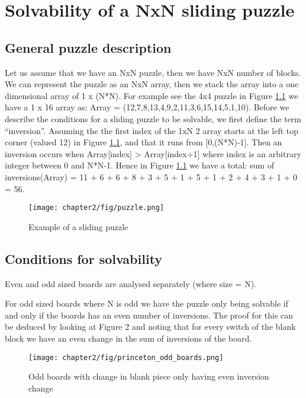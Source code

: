 \graphicspath{{chapter2/fig}}
\chapter{Solvability of a NxN sliding puzzle}
\label{chap:Solvability of a NxN sliding puzzle}
\section{General puzzle description}
Let us assume that we have an NxN puzzle, then we have NxN number of blocks. We can represent the puzzle as an NxN array, then we stack the array into a one dimensional array of 1 x (N*N). For example see the 4x4 puzzle in Figure \ref{fig:sliding_puzzle} we have a 1 x 16 array as: 
Array = (12,7,8,13,4,9,2,11,3,6,15,14,5,1,10).
Before we describe the conditions for a sliding puzzle to be solvable, we first define the term “inversion”. Assuming the the first index of the 1xN 2 array starts at the left top corner (valued 12) in
Figure \ref{fig:sliding_puzzle}, and that it runs from [0,(N*N)-1]. Then an inversion occurs when Array[index] >
Array[index+1] where index is an arbitrary integer between 0 and N*N-1. Hence in Figure \ref{fig:sliding_puzzle} we have a
total: sum of inversions(Array) = 11 + 6 + 6 + 8 + 3 + 5 + 1 + 5 + 1 + 2 + 4 + 3 + 1 + 0 = 56.

\begin{figure}[!htb]
	\centering
	\texttt{[image: chapter2/fig/puzzle.png]}
	\caption{Example of a sliding puzzle}
	\label{fig:sliding_puzzle}
\end{figure}

\section{Conditions for solvability}
Even and odd sized boards are analysed separately (where size = N).

For odd sized boards where N is odd we have the puzzle only being solvable if and only if the boards
has an even number of inversions. The proof for this can be deduced by looking at Figure 2 and noting that for every switch of the blank block we have an even change in the sum of inversions of the board. \cite{princeton_8puzzle_assignment}

\begin{figure}[!htb]
	\centering
	\texttt{[image: chapter2/fig/princeton\_odd\_boards.png]}
	\caption{Odd boards with change in blank piece only having even inversion change \cite{princeton_8puzzle_assignment}}
	\label{fig:sol_odd_board}
\end{figure}


